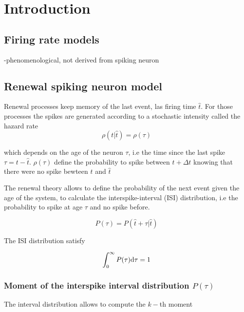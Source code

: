 \documentclass[a4paper,11pt,twoside]{article}
\def \dd  {{\rm d}}
\numberwithin{equation}{section}
\begin{document}
\tableofcontents
\newpage

\section{Introduction}
\label{sec:intro}

\subsection{Firing rate models}
\label{subsec:riringrate}
-phenomenological, not derived from spiking neuron \cite{DayAbb05}

\subsection{Renewal spiking neuron model}
\label{subsec:renew}

Renewal processes keep memory of the last event, las firing time $\hat{t}$. For those processes the spikes are generated according to a stochastic intensity called the hazard rate
\begin{equation}
\label{eq:rho1}
\rho(t|\hat{t})=\rho(\tau)
\end{equation}

which depends on the age of the neuron $\tau$, i.e the time since the last spike $\tau=t-\hat{t}$. $\rho(\tau)$ define the probability to spike between $t+\Delta t$ knowing that there were no spike bewteen $t$ and $\hat{t}$

The renewal theory allows to define the probability of the next event given the age of the system, to calculate the interspike-interval (ISI) distribution, i.e the probability to spike at age $\tau$ and no spike before.

\begin{equation}
\label{eq:P1}
P(\tau)=P(\hat{t}+\tau| \hat{t})
\end{equation}

The ISI distribution satisfy

\begin{equation}
\label{eq:Pnorm}
\int_0^\infty P(\tau)\dd\tau=1 
\end{equation}

\subsubsection{Moment of the interspike interval distribution $P(\tau)$}
The interval distribution allows to compute the $k-$th moment
\end{document}
